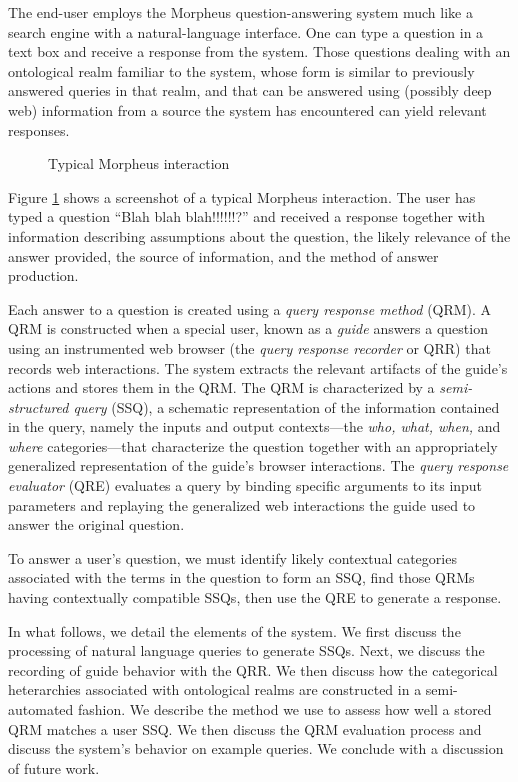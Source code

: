 
The end-user employs the Morpheus question-answering system much like a
search engine with a natural-language interface. One can type a question
in a text box and receive a response from the system. Those questions
dealing with an ontological realm familiar to the system, whose form is
similar to previously answered queries in that realm, and that can be
answered using (possibly deep web) information from a source the system
has encountered can yield relevant responses.

\begin{figure}
\caption{Typical Morpheus interaction}
\label{fig:screenshot}
\end{figure}

Figure \ref{fig:screenshot} shows a screenshot of a typical Morpheus
interaction. The user has typed a question ``Blah blah blah!!!!!!?'' and
received a response together with information describing assumptions
about the question, the likely relevance of the answer provided,
the source of information, and the method of answer production.

Each answer to a question is created using a \emph{query response
  method} (QRM). A QRM is constructed when a special user, known as a
\emph{guide} answers a question using an instrumented web browser (the
\emph{query response recorder} or QRR) that records web
interactions. The system extracts the relevant artifacts of the
guide's actions and stores them in the QRM. The QRM is characterized
by a \emph{semi-structured query} (SSQ), a schematic representation of
the information contained in the query, namely the inputs and output
contexts---the \emph{who, what, when,} and \emph{where}
categories---that characterize the question together with an
appropriately generalized representation of the guide's browser
interactions.  The \emph{query response evaluator} (QRE) evaluates a
query by binding specific arguments to its input parameters and
replaying the generalized web interactions the guide used to answer
the original question.

To answer a user's question, we must identify likely contextual
categories associated with the terms in the question to form an SSQ,
find those QRMs having contextually compatible SSQs, then use the QRE to
generate a response.


In what follows, we detail the elements of the system.  We first
discuss the processing of natural language queries to generate SSQs.
Next, we discuss the recording of guide behavior with the QRR.  We
then discuss how the categorical heterarchies associated with
ontological realms are constructed in a semi-automated fashion.  We
describe the method we use to assess how well a stored QRM matches a
user SSQ.  We then discuss the QRM evaluation process and discuss the
system's behavior on example queries. We conclude with a discussion of
future work.
 
